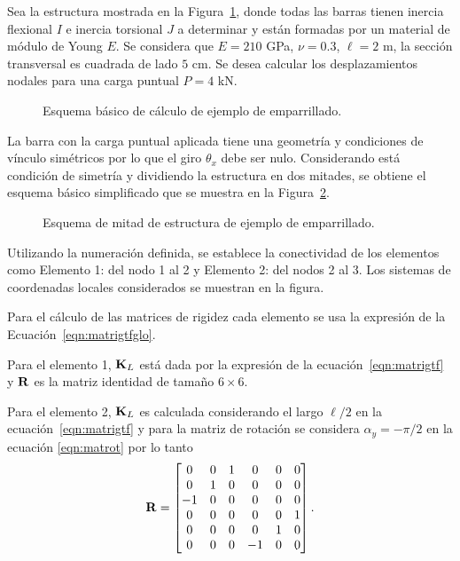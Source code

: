 Sea la estructura mostrada en la Figura~\ref{fig:UT5_ejemplo}, donde todas las barras tienen inercia flexional $I$ e inercia torsional $J$ a determinar y están formadas por un material de módulo de Young $E$. %
Se considera que $E=210$ GPa, $\nu=0.3$, $\ell=2 $ m, la sección transversal es cuadrada de lado $5$ cm. %
%
Se desea calcular los desplazamientos nodales para una carga puntual $P=4 $ kN.

\begin{figure}[htb]
	\centering
	\def\svgwidth{0.6\textwidth}
	
	\caption{Esquema básico de cálculo de ejemplo de emparrillado.}
	\label{fig:UT5_ejemplo}
\end{figure}

La barra con la carga puntual aplicada tiene una geometría y condiciones de vínculo simétricos por lo que el giro $\theta_x$ debe ser nulo.
%
Considerando está condición de simetría  y dividiendo la estructura en dos mitades, se obtiene el esquema básico simplificado que se muestra en la Figura~\ref{fig:UT5_ejemplo2}.

\begin{figure}[htb]
	\centering
	\def\svgwidth{0.7\textwidth}
	
	\caption{Esquema de mitad de estructura de ejemplo de emparrillado.}
	\label{fig:UT5_ejemplo2}
\end{figure}

Utilizando la numeración definida, se establece la conectividad de los elementos como Elemento 1: del nodo 1 al 2 y Elemento 2: del nodos 2 al 3. %
Los sistemas de coordenadas locales considerados se muestran en la figura.

Para el cálculo de las matrices de rigidez cada elemento se usa la expresión de la Ecuación~\eqref{eqn:matrigtfglo}.

Para el elemento 1, ${\bf K}_L$ está dada por la expresión de la ecuación~\eqref{eqn:matrigtf} y ${\bf R}$ es la matriz identidad de tamaño $6\times6$.

Para el elemento 2, ${\bf K}_L$ es calculada considerando el largo $\ell/2$ en la ecuación~\eqref{eqn:matrigtf} y para la matriz de rotación se considera $\alpha_y=-\pi/2$ en la ecuación \eqref{eqn:matrot} por lo tanto
\begin{equation}
\bfR = 
\left[
\begin{matrix}
0 & 0  & 1 & 0 & 0 & 0\\
0 & 1 & 0 &  0 & 0 & 0\\
-1 & 0  & 0 & 0 & 0 & 0\\
%
0 & 0 & 0 & 0 & 0  & 1 \\
0 & 0 & 0 & 0 & 1 & 0 \\
0 & 0 & 0 & -1 & 0  & 0
\end{matrix}
\right].
%
\end{equation}


